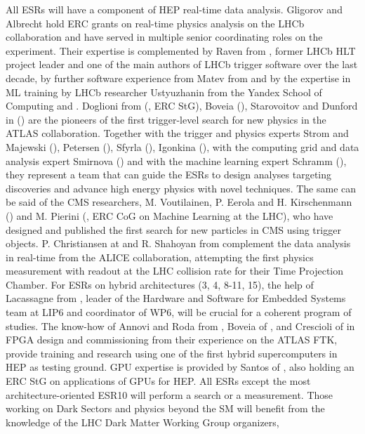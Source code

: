 All ESRs will have a component of HEP real-time data analysis. 
Gligorov and Albrecht hold ERC grants on real-time physics analysis on the LHCb collaboration and have served in
multiple senior coordinating roles on the experiment. 
Their expertise is complemented by Raven from \nikhefentity, former LHCb HLT project leader and one of
the main authors of LHCb trigger software over the last decade, by further software experience from Matev from \cernentity
and by the expertise in ML training
by LHCb researcher Ustyuzhanin from the Yandex School of Computing and \cernentity.   
Doglioni from (\lundentity, ERC StG), Boveia (\ohioentity),  Starovoitov and
Dunford in (\heidelbergentity) are the pioneers of the first trigger-level search for new physics in the
ATLAS collaboration. Together with the trigger and physics experts Strom and Majewski (\oregonentity), 
Petersen (\cern), Sfyrla (\unigeentity), Igonkina (\nikhefentity), with the computing grid and data analysis expert 
Smirnova (\lundentity) and with the machine learning expert Schramm (\unigeentity), 
they represent a team that can guide the ESRs to design analyses targeting discoveries and
advance high energy physics with novel techniques. 
The same can be said of the CMS researchers, M. Voutilainen, P. Eerola and H. Kirschenmann (\helsinkientity)
and M. Pierini (\cernentity, ERC CoG on Machine Learning at the LHC), who have designed and 
published the first search for new particles in CMS using trigger objects. P. Christiansen at \lundentity
and R. Shahoyan from \cernentity complement the data analysis in real-time from the ALICE collaboration,
attempting the first physics measurement with readout at the LHC collision rate for their Time Projection Chamber. 
%
For ESRs on hybrid architectures (3, 4, 8-11, 15), the help of
Lacassagne from \sorbonneentity, leader of the Hardware and Software for Embedded Systems team at LIP6 and
coordinator of WP6, will be crucial for a coherent program of studies. 
The know-how of Annovi and Roda from \pisaentity, Boveia of \ohioentity, and Crescioli of \cnrsentity in FPGA design
and commissioning from their experience on the ATLAS FTK, provide training and research 
using one of the first hybrid supercomputers in HEP as testing ground. 
GPU expertise is provided by Santos of \santiagoentity,
also holding an ERC StG on applications of GPUs for HEP. 
%
All ESRs except the most architecture-oriented ESR10 will perform a search or a measurement. Those
working on Dark Sectors and physics beyond the SM will benefit from the knowledge of the LHC Dark Matter Working Group organizers, 
